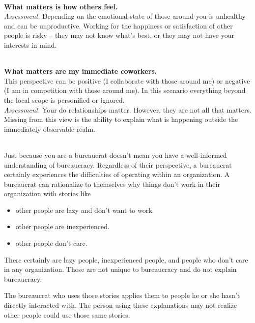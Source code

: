 \ \\ 
\textbf{What matters is how others feel.}\\
\textit{Assessment}: Depending on the emotional state of those around you is unhealthy and can be unproductive. Working for the happiness or satisfaction of other people is risky -- they may not know what's best, or they may not have your interests in mind.

\ \\
\textbf{What matters are my immediate coworkers.}\\
This perspective can be positive (I collaborate with those around me) or negative (I am in competition with those around me).
In this scenario everything beyond the local scope is personified or ignored.  \\
\textit{Assessment}: Your do relationships matter. However, they are not all that matters. Missing from this view is the ability to explain what is happening outside the immediately observable realm. 

\ \\

Just because you are a bureaucrat doesn't mean you have a well-informed understanding of bureaucracy. Regardless of their perspective, a bureaucrat certainly experiences the difficulties of operating within an organization. A bureaucrat can rationalize to themselves why things don't work in their organization with stories like
\begin{itemize}
\item other people are lazy and don't want to work.
\item other people are inexperienced.
\item other people don't care.
\end{itemize}
There certainly are lazy people, inexperienced people, and people who don't care in any organization. Those are not unique to bureaucracy and do not explain bureaucracy.

The bureaucrat who uses those stories applies them to people he or she hasn't directly interacted with.  The person using these explanations may not realize other people could use those same stories. 